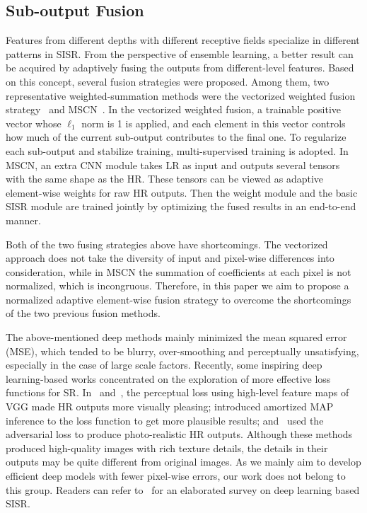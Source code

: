 \documentclass[journal]{IEEEtran}
\begin{document}
\subsection{Sub-output Fusion} 

Features from different depths with different receptive fields specialize in different patterns in SISR. From the perspective of ensemble learning, a better result can be acquired by adaptively fusing the outputs from different-level features. Based on this concept, several fusion strategies were proposed. Among them, two representative weighted-summation methods were the vectorized weighted fusion strategy~\cite{kim2016deeply,Tai-MemNet-2017} and MSCN~\cite{liu2016learning}. In the vectorized weighted fusion, a trainable positive vector whose $\ell_{1}$ norm is 1 is applied, and each element in this vector controls how much of the current sub-output contributes to the final one. To regularize each sub-output and stabilize training, multi-supervised training is adopted. In MSCN, an extra CNN module takes LR as input and outputs several tensors with the same shape as the HR. These tensors can be viewed as adaptive element-wise weights for raw HR outputs. Then the weight module and the basic SISR module are trained jointly by optimizing the fused results in an end-to-end manner. 

Both of the two fusing strategies above have shortcomings. The vectorized approach does not take the diversity of input and pixel-wise differences into consideration, while in MSCN the summation of coefficients at each pixel is not normalized, which is incongruous. Therefore, in this paper we aim to propose a normalized adaptive element-wise fusion strategy to overcome the shortcomings of the two previous fusion methods. 

The above-mentioned deep methods mainly minimized the mean squared error (MSE), which tended to be blurry, over-smoothing and perceptually unsatisfying, especially in the case of large scale factors. Recently, some inspiring deep learning-based works concentrated on the exploration of more effective loss functions for SR. In~\cite{bruna2015super} and~\cite{johnson2016perceptual}, the perceptual loss using high-level feature maps of VGG made HR outputs more visually pleasing; \cite{sonderby2016amortised} introduced amortized MAP inference to the loss function to get more plausible results; \cite{ledig2016photo} and~\cite{sajjadi2016enhancenet} used the adversarial loss to produce photo-realistic HR outputs. Although these methods produced high-quality images with rich texture details, the details in their outputs may be quite different from original images. As we mainly aim to develop efficient deep models with fewer pixel-wise errors, our work does not belong to this group. Readers can refer to~\cite{yang2018deep} for an elaborated survey on deep learning based SISR.
\end{document}
